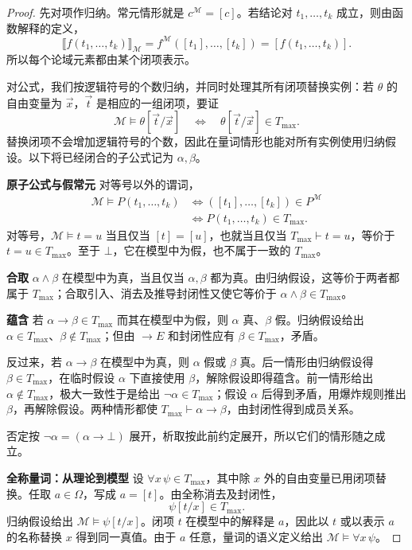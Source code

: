 \documentclass[lang=cn,a4paper,fontset=none,zihao=false,10pt,openany,twoside]{beautybook}
\numberwithin{algorithm}{chapter}
\begin{document}
\begin{proof}
先对项作归纳。常元情形就是 $c^{\mathcal M}=[c]$。若结论对 $t_1,\ldots,t_k$ 成立，则由函数解释的定义，
\[
 \llbracket f(t_1,\ldots,t_k)\rrbracket_{\mathcal M}
 =f^{\mathcal M}([t_1],\ldots,[t_k])=[f(t_1,\ldots,t_k)].
\]
所以每个论域元素都由某个闭项表示。

对公式，我们按逻辑符号的个数归纳，并同时处理其所有闭项替换实例：若 $\theta$ 的自由变量为 $\vec x$，$\vec t$ 是相应的一组闭项，要证
\[
 \mathcal M\models\theta[\vec t/\vec x]
 \quad\Longleftrightarrow\quad\theta[\vec t/\vec x]\in T_{\max}.
\]
替换闭项不会增加逻辑符号的个数，因此在量词情形也能对所有实例使用归纳假设。以下将已经闭合的子公式记为 $\alpha,\beta$。

\par\smallskip\noindent\textbf{原子公式与假常元}\quad
对等号以外的谓词，
\begin{align*}
 \mathcal M\models P(t_1,\ldots,t_k)
 &\Longleftrightarrow([t_1],\ldots,[t_k])\in P^{\mathcal M}\\
 &\Longleftrightarrow P(t_1,\ldots,t_k)\in T_{\max}.
\end{align*}
对等号，$\mathcal M\models t=u$ 当且仅当 $[t]=[u]$，也就当且仅当 $T_{\max}\vdash t=u$，等价于 $t=u\in T_{\max}$。至于 $\bot$，它在模型中为假，也不属于一致的 $T_{\max}$。

\par\smallskip\noindent\textbf{合取}\quad
$\alpha\wedge\beta$ 在模型中为真，当且仅当 $\alpha,\beta$ 都为真。由归纳假设，这等价于两者都属于 $T_{\max}$；合取引入、消去及推导封闭性又使它等价于 $\alpha\wedge\beta\in T_{\max}$。

\par\smallskip\noindent\textbf{蕴含}\quad
若 $\alpha\to\beta\in T_{\max}$ 而其在模型中为假，则 $\alpha$ 真、$\beta$ 假。归纳假设给出 $\alpha\in T_{\max}$、$\beta\notin T_{\max}$；但由 $\to E$ 和封闭性应有 $\beta\in T_{\max}$，矛盾。

反过来，若 $\alpha\to\beta$ 在模型中为真，则 $\alpha$ 假或 $\beta$ 真。后一情形由归纳假设得 $\beta\in T_{\max}$，在临时假设 $\alpha$ 下直接使用 $\beta$，解除假设即得蕴含。前一情形给出 $\alpha\notin T_{\max}$，极大一致性于是给出 $\neg\alpha\in T_{\max}$；假设 $\alpha$ 后得到矛盾，用爆炸规则推出 $\beta$，再解除假设。两种情形都使 $T_{\max}\vdash\alpha\to\beta$，由封闭性得到成员关系。

否定按 $\neg\alpha=(\alpha\to\bot)$ 展开，析取按此前约定展开，所以它们的情形随之成立。

\par\smallskip\noindent\textbf{全称量词：从理论到模型}\quad
设 $\forall x\,\psi\in T_{\max}$，其中除 $x$ 外的自由变量已用闭项替换。任取 $a\in\Omega$，写成 $a=[t]$。由全称消去及封闭性，
\[
 \psi[t/x]\in T_{\max}.
\]
归纳假设给出 $\mathcal M\models\psi[t/x]$。闭项 $t$ 在模型中的解释是 $a$，因此以 $t$ 或以表示 $a$ 的名称替换 $x$ 得到同一真值。由于 $a$ 任意，量词的语义定义给出 $\mathcal M\models\forall x\,\psi$。


\end{proof}
\end{document}

